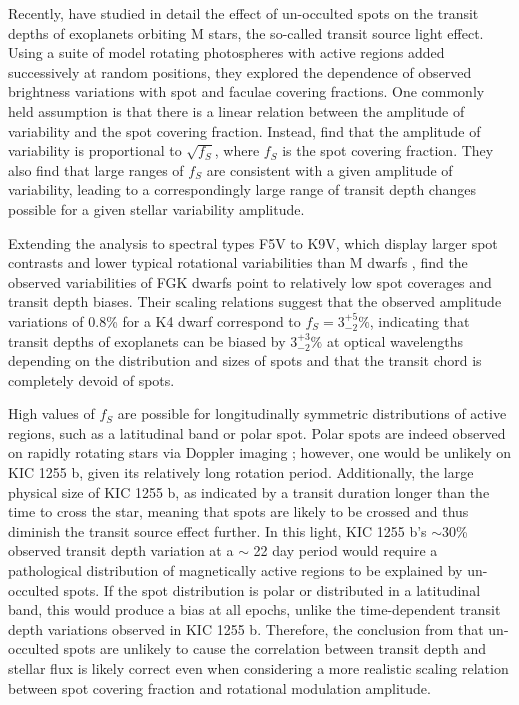 \documentclass[preprint,trackchanges]{aastex61}
\newcommand{\sha}{KIC 1255 b}
\begin{document}
{Recently, \citet{rackham2018transitSourceEffect} have studied in detail the effect of un-occulted spots on the transit depths of exoplanets orbiting M stars, the so-called transit source light effect.
Using a suite of model rotating photospheres with active regions added successively at random positions, they explored the dependence of observed brightness variations with spot and faculae covering fractions.
One commonly held assumption is that there is a linear relation between the amplitude of variability and the spot covering fraction.
Instead, \citet{rackham2018transitSourceEffect} find that the amplitude of variability is proportional to $\sqrt{f_S}$, where $f_S$ is the spot covering fraction.
They also find that large ranges of $f_{S}$ are consistent with a given amplitude of variability, leading to a correspondingly large range of transit depth changes possible for a given stellar variability amplitude.

Extending the analysis to spectral types F5V to K9V, which display larger spot contrasts \citep{berdyugina2005spots} and lower typical rotational variabilities than M dwarfs \citep{mcquillan2014rotationPeriodsAutoC}, \citet{rackham2018activityFGKsubmitted} find the observed variabilities of FGK dwarfs point to relatively low spot coverages and transit depth biases.
Their scaling relations suggest that the observed amplitude variations of 0.8\% \citep{kawahara2013starspots} for a K4 dwarf correspond to $f_{S}=3^{+5}_{-2}\%$, indicating that transit depths of exoplanets can be biased by $3^{+3}_{-2}\%$ at optical wavelengths depending on the distribution and sizes of spots and that the transit chord is completely devoid of spots.

High values of $f_S$ are possible for longitudinally symmetric distributions of active regions, such as a latitudinal band or polar spot.
Polar spots are indeed observed on rapidly rotating stars via Doppler imaging \citep{strassmeier2009starspots}; however, one would be unlikely on \sha, given its relatively long rotation period.
Additionally, the large physical size of \sha, as indicated by a transit duration longer than the time to cross the star, meaning that spots are likely to be crossed and thus diminish the transit source effect further.
In this light, \sha's $\sim$30\% observed transit depth variation at a $\sim$ 22 day period would require a pathological distribution of magnetically active regions to be explained by un-occulted spots.
If the spot distribution is polar or distributed in a latitudinal band, this would produce a bias at all epochs, unlike the time-dependent transit depth variations observed in \sha.
Therefore, the conclusion from \citet{croll2015starspots} that un-occulted spots are unlikely to cause the correlation between transit depth and stellar flux is likely correct even when considering a more realistic scaling relation between spot covering fraction and rotational modulation amplitude.
}
\end{document}
